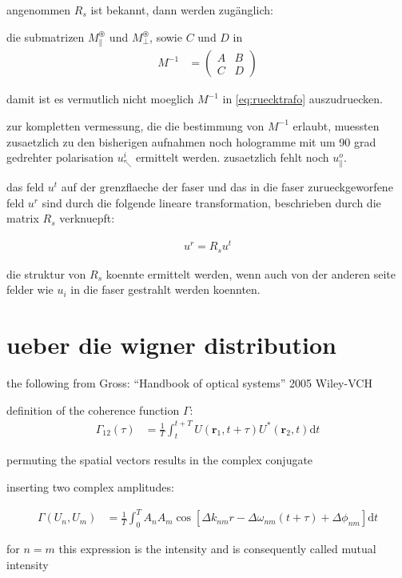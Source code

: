 \documentclass{article}
\newcommand{\vect}[1]{\mathbf{#1}}
\renewcommand{\r}{\vect r}
\begin{document}
angenommen $R_s$ ist bekannt, dann werden zug\"anglich: 

die submatrizen $M^\circledast_\parallel$ und $M^\circledast_\perp$,
sowie $C$ und $D$ in
\begin{align}
  M^{-1} &=\begin{pmatrix}
    A & B \\ C& D
  \end{pmatrix}
\end{align}

damit ist es vermutlich nicht moeglich $M^{-1}$ in
\eqref{eq:ruecktrafo} auszudruecken.

zur kompletten vermessung, die die bestimmung von $M^{-1}$ erlaubt,
muessten zusaetzlich zu den bisherigen aufnahmen noch hologramme mit
um 90 grad gedrehter polarisation $u^i_\nwarrow$ ermittelt
werden. zusaetzlich fehlt noch $u^o_\parallel$.

das feld $u^t$ auf der grenzflaeche der faser und das in die faser
zurueckgeworfene feld $u^r$ sind durch die folgende lineare
transformation, beschrieben durch die matrix $R_s$ verknuepft:

\begin{align}
  u^r = R_s u^t
\end{align}

die struktur von $R_s$ koennte ermittelt werden, wenn auch von der
anderen seite felder wie $u_i$ in die faser gestrahlt werden koennten.

\section{ueber die wigner distribution}
the following from Gross: ``Handbook of optical systems'' 2005 Wiley-VCH

definition of the coherence function $\Gamma$:
\begin{align}
  \Gamma_{12}(\tau) &= \frac{1}{T}\int_t^{t+T} U(\r_1,t+\tau) U^*(\r_2,t)\textrm{d}t
\end{align}

permuting the spatial vectors results in the complex conjugate

inserting two complex amplitudes:

\begin{align}
  \Gamma(U_n, U_m) &= \frac{1}{T}\int_0^T A_n A_m \cos\left[ \Delta k_{nm} r -\Delta\omega_{nm}(t+\tau) + \Delta\phi_{nm} \right]\textrm{d}t
\end{align}

for $n=m$ this expression is the intensity and is consequently called mutual intensity
\end{document}
